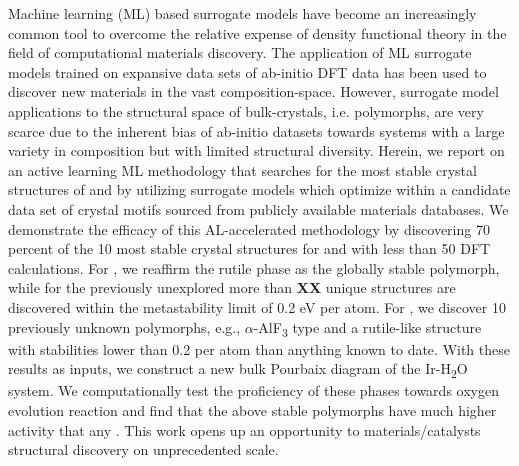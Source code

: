 %



%
Machine learning (ML) based surrogate models have become an increasingly common tool to overcome the relative expense of density functional theory in the field of computational materials discovery.
%
The application of ML surrogate models trained on expansive data sets of ab-initio DFT data has been used to discover new materials in the vast composition-space.
%
However, surrogate model applications to the structural space of bulk-crystals, i.e. polymorphs, are very scarce due to the inherent bias of ab-initio datasets towards systems with a large variety in composition but with limited structural diversity.
%
Herein, we report on an active learning ML methodology that searches for the most stable crystal structures of \IrOtwo and \IrOthree by utilizing surrogate models which optimize within a candidate data set of crystal motifs sourced from publicly available materials databases.
We demonstrate the efficacy of this AL-accelerated methodology by discovering 70 percent of the 10 most stable crystal structures for \IrOtwo and \IrOthree with less than 50 DFT calculations.
For \IrOtwo, we reaffirm the rutile phase as the globally stable polymorph,
while for the previously unexplored \IrOthree more than {\bf XX} unique structures are discovered within the metastability limit of 0.2 eV per atom.
%
For \IrOthree, we discover 10 previously unknown polymorphs, e.g.,
$\alpha$-AlF\textsubscript{3} type and a rutile-like \IrOthree structure with stabilities lower than 0.2 per atom than anything known to date.
%
With these results as inputs, we construct a new bulk Pourbaix diagram of the Ir-H\textsubscript{2}O system.
%
We computationally test the proficiency of these phases towards oxygen evolution reaction and find that the above stable \IrOthree polymorphs have much higher activity that any \IrOtwo.
%
This work opens up an opportunity to materials/catalysts structural discovery on unprecedented scale.
